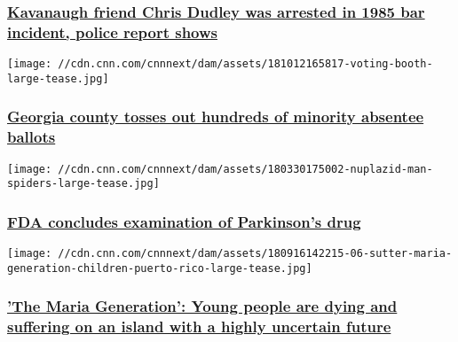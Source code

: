 \hypertarget{kavanaugh-friend-chris-dudley-was-arrested-in-1985-bar-incident-police-report-shows}{%
\subsubsection{\texorpdfstring{\href{/2018/10/02/politics/brett-kavanaugh-chris-dudley-police-report/index.html}{Kavanaugh
friend Chris Dudley was arrested in 1985 bar incident, police report
shows}}{Kavanaugh friend Chris Dudley was arrested in 1985 bar incident, police report shows}}\label{kavanaugh-friend-chris-dudley-was-arrested-in-1985-bar-incident-police-report-shows}}

\href{/2018/10/20/politics/gwinnett-county-absentee-ballots/index.html}{}

\texttt{[image: //cdn.cnn.com/cnnnext/dam/assets/181012165817-voting-booth-large-tease.jpg]}

\hypertarget{georgia-county-tosses-out-hundreds-of-minority-absentee-ballots}{%
\subsubsection{\texorpdfstring{\href{/2018/10/20/politics/gwinnett-county-absentee-ballots/index.html}{Georgia
county tosses out hundreds of minority absentee
ballots}}{Georgia county tosses out hundreds of minority absentee ballots}}\label{georgia-county-tosses-out-hundreds-of-minority-absentee-ballots}}

\href{/2018/09/20/health/fda-nuplazid-invs/index.html}{}

\texttt{[image: //cdn.cnn.com/cnnnext/dam/assets/180330175002-nuplazid-man-spiders-large-tease.jpg]}

\hypertarget{fda-concludes-examination-of-parkinsons-drug-}{%
\subsubsection{\texorpdfstring{\href{/2018/09/20/health/fda-nuplazid-invs/index.html}{FDA
concludes examination of Parkinson's drug
}}{FDA concludes examination of Parkinson's drug }}\label{fda-concludes-examination-of-parkinsons-drug-}}

\href{/2018/09/17/health/sutter-maria-generation-children-puerto-rico/index.html}{}

\texttt{[image: //cdn.cnn.com/cnnnext/dam/assets/180916142215-06-sutter-maria-generation-children-puerto-rico-large-tease.jpg]}

\hypertarget{the-maria-generation-young-people-are-dying-and-suffering-on-an-island-with-a-highly-uncertain-future-}{%
\subsubsection{\texorpdfstring{\href{/2018/09/17/health/sutter-maria-generation-children-puerto-rico/index.html}{'The
Maria Generation': Young people are dying and suffering on an island
with a highly uncertain future
}}{'The Maria Generation': Young people are dying and suffering on an island with a highly uncertain future }}\label{the-maria-generation-young-people-are-dying-and-suffering-on-an-island-with-a-highly-uncertain-future-}}

